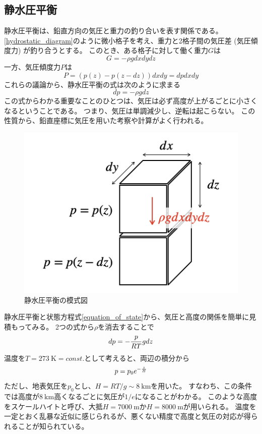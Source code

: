 \documentclass[a4paper,11pt,platex]{jsarticle}
\numberwithin{equation}{section}
\begin{document}
\subsection{静水圧平衡}
静水圧平衡は、鉛直方向の気圧と重力の釣り合いを表す関係である。
\autoref{hydrostatic_diagram}のように微小格子を考え、重力と2格子間の気圧差 (気圧傾度力) が釣り合うとする。
このとき、ある格子に対して働く重力$G$は
\begin{equation}
    G = -\rho g dx dy dz
\end{equation}
一方、気圧傾度力$P$は
\begin{equation}
    P = \left(p\left(z\right) - p\left(z-dz\right)\right) dx dy = dp dx dy
\end{equation}
これらの議論から、静水圧平衡の式は次のように求まる
\begin{equation}
    \label{hydrostatic_balance}
    dp = -\rho g dz
\end{equation}
この式からわかる重要なことのひとつは、気圧は必ず高度が上がるごとに小さくなるということである。
つまり、気圧は単調減少し、逆転は起こらない。
この性質から、鉛直座標に気圧を用いた考察や計算がよく行われる。
\begin{figure}
    \centering
    \includegraphics[scale=0.5]{figs/hydrostatic_diagram.png}
    \caption{静水圧平衡の模式図}
    \label{hydrostatic_diagram}
\end{figure}

静水圧平衡と状態方程式\autoref{equation_of_state}から、気圧と高度の関係を簡単に見積もってみる。
2つの式から$\rho$を消去することで
\begin{equation}
    dp = -{p \over RT} g dz
\end{equation}
温度を$T=273 \: \mathrm{K} = const.$として考えると、両辺の積分から
\begin{equation}
    p = p_0e^{-{z \over H}}
\end{equation}
ただし、地表気圧を$p_0$とし、$H=RT/g\sim 8 \:\mathrm{km}$を用いた。
すなわち、この条件では高度が$8 \:\mathrm{km}$高くなるごとに気圧が$1/e$になることがわかる。
このような高度をスケールハイトと呼び、大抵$H=7000 \: \mathrm{m}$か$H=8000 \: \mathrm{m}$が用いられる。
温度を一定とおく乱暴な近似に感じられるが、悪くない精度で高度と気圧の対応が得られることが知られている。
\end{document}
